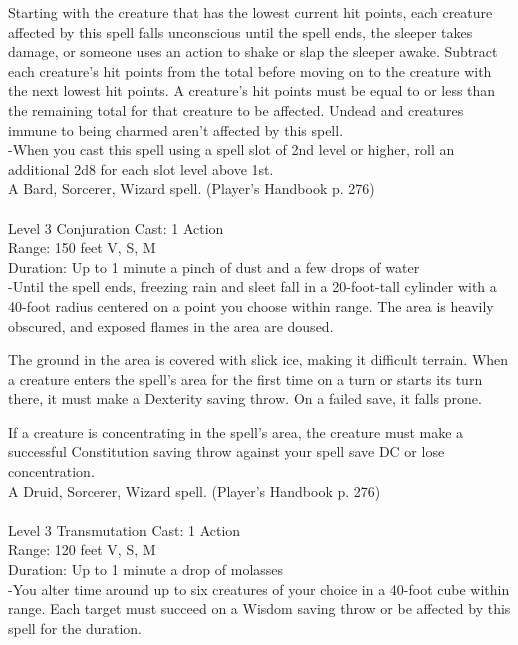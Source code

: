 \documentclass[10pt,twocolumn]{report}
\begin{document}
Starting with the creature that has the lowest current hit points, each creature affected by this spell falls unconscious until the spell ends, the sleeper takes damage, or someone uses an action to shake or slap the sleeper awake. Subtract each creature’s hit points from the total before moving on to the creature with the next lowest hit points. A creature’s hit points must be equal to or less than the remaining total for that creature to be affected.
Undead and creatures immune to being charmed aren’t affected by this spell.\\
-When you cast this spell using a spell slot of 2nd level or higher, roll an additional 2d8 for each slot level above 1st.\\
A Bard, Sorcerer, Wizard spell. (Player's Handbook p. 276) \\


 \\
Level 3 \quad Conjuration \quad Cast: 1 Action\\
Range: 150 feet \quad V, S, M\\
Duration: Up to 1 minute \quad a pinch of dust and a few drops of water\\
-Until the spell ends, freezing rain and sleet fall in a 20-foot-tall cylinder with a 40-foot radius centered on a point you choose within range. The area is heavily obscured, and exposed flames in the area are doused.

The ground in the area is covered with slick ice, making it difficult terrain. When a creature enters the spell’s area for the first time on a turn or starts its turn there, it must make a Dexterity saving throw. On a failed save, it falls prone.

If a creature is concentrating in the spell’s area, the creature must make a successful Constitution saving throw against your spell save DC or lose concentration.\\
A Druid, Sorcerer, Wizard spell. (Player's Handbook p. 276) \\


 \\
Level 3 \quad Transmutation \quad Cast: 1 Action\\
Range: 120 feet \quad V, S, M\\
Duration: Up to 1 minute \quad a drop of molasses\\
-You alter time around up to six creatures of your choice in a 40-foot cube within range. Each target must succeed on a Wisdom saving throw or be affected by this spell for the duration.
\end{document}
